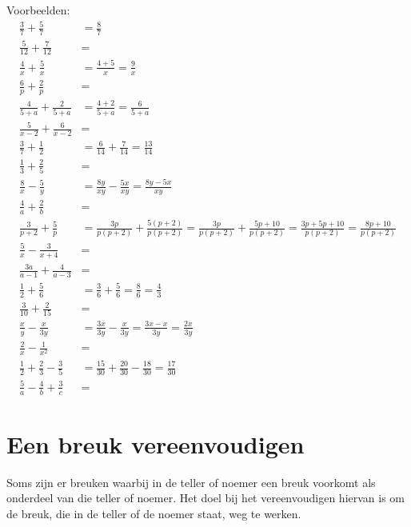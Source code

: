 Voorbeelden:
\begin{align*}
\frac{3}{7} + \frac{5}{7}       &= \frac{8}{7} \\[1em]
\frac{5}{12} + \frac{7}{12}     &= \\[1em]
\frac{4}{x} + \frac{5}{x}       &= \frac{4+5}{x} = \frac{9}{x} \\[1em]
\frac{6}{p} + \frac{2}{p}       &= \\[1em]
\frac{4}{5+a} + \frac{2}{5+a}   &= \frac{4+2}{5+a} = \frac{6}{5+a} \\[1em]
\frac{5}{x-2} + \frac{6}{x-2}   &= \\[1em]
\frac{3}{7} + \frac{1}{2}       &= \frac{6}{14} + \frac{7}{14} = \frac{13}{14} \\[1em]
\frac{1}{3} + \frac{2}{5}       &= \\[1em]
\frac{8}{x} - \frac{5}{y}       &= \frac{8y}{xy} - \frac{5x}{xy} = \frac{8y-5x}{xy} \\[1em]
\frac{4}{a} + \frac{2}{b}       &= \\[1em]
\frac{3}{p+2} + \frac{5}{p}     &= \frac{3p}{p(p+2)} + \frac{5(p+2)}{p(p+2)} = \frac{3p}{p(p+2)} + \frac{5p+10}{p(p+2)} = \frac{3p+5p+10}{p(p+2)} = \frac{8p+10}{p(p+2)} \\[1em]
\frac{5}{x} - \frac{3}{x+4}     &= \\[1em]
\frac{3a}{a-1} + \frac{4}{a-3}  &= \\[1em]
\frac{1}{2} + \frac{5}{6}       &= \frac{3}{6} + \frac{5}{6} = \frac{8}{6} = \frac{4}{3} \\[1em]
\frac{3}{10} + \frac{2}{15}     &= \\[1em]
\frac{x}{y} - \frac{x}{3y}      &= \frac{3x}{3y} - \frac{x}{3y} = \frac{3x-x}{3y} = \frac{2x}{3y} \\[1em]
\frac{2}{x} - \frac{1}{x^2}     &= \\[1em]
\frac{1}{2} + \frac{2}{3} - \frac{3}{5} &= \frac{15}{30} + \frac{20}{30} - \frac{18}{30} = \frac{17}{30} \\[1em]
\frac{5}{a} - \frac{4}{b} + \frac{3}{c} &=
\end{align*}

\section{Een breuk vereenvoudigen}
Soms zijn er breuken waarbij in de teller of noemer een breuk voorkomt als onderdeel van die teller of noemer. Het doel bij het vereenvoudigen hiervan is om de breuk, die in de teller of de noemer staat, weg te werken.

